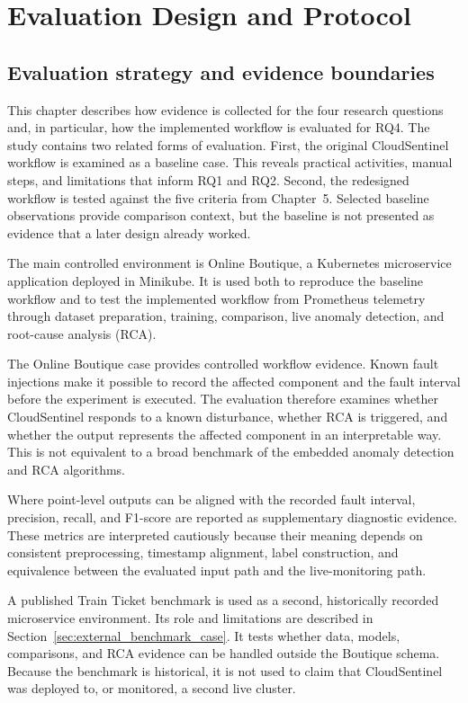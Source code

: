 \chapter{Evaluation Design and Protocol}
\label{ch:evaluation_design}

\section{Evaluation strategy and evidence boundaries}
This chapter describes how evidence is collected for the four research questions and, in particular, how the implemented workflow is evaluated for RQ4. The study contains two related forms of evaluation. First, the original CloudSentinel workflow is examined as a baseline case. This reveals practical activities, manual steps, and limitations that inform RQ1 and RQ2. Second, the redesigned workflow is tested against the five criteria from Chapter~5. Selected baseline observations provide comparison context, but the baseline is not presented as evidence that a later design already worked.

The main controlled environment is Online Boutique, a Kubernetes microservice application deployed in Minikube. It is used both to reproduce the baseline workflow and to test the implemented workflow from Prometheus telemetry through dataset preparation, training, comparison, live anomaly detection, and root-cause analysis (RCA).

The Online Boutique case provides controlled workflow evidence. Known fault injections make it possible to record the affected component and the fault interval before the experiment is executed. The evaluation therefore examines whether CloudSentinel responds to a known disturbance, whether RCA is triggered, and whether the output represents the affected component in an interpretable way. This is not equivalent to a broad benchmark of the embedded anomaly detection and RCA algorithms.

Where point-level outputs can be aligned with the recorded fault interval, precision, recall, and F1-score are reported as supplementary diagnostic evidence. These metrics are interpreted cautiously because their meaning depends on consistent preprocessing, timestamp alignment, label construction, and equivalence between the evaluated input path and the live-monitoring path.

A published Train Ticket benchmark is used as a second, historically recorded microservice environment. Its role and limitations are described in Section~\ref{sec:external_benchmark_case}. It tests whether data, models, comparisons, and RCA evidence can be handled outside the Boutique schema. Because the benchmark is historical, it is not used to claim that CloudSentinel was deployed to, or monitored, a second live cluster.

